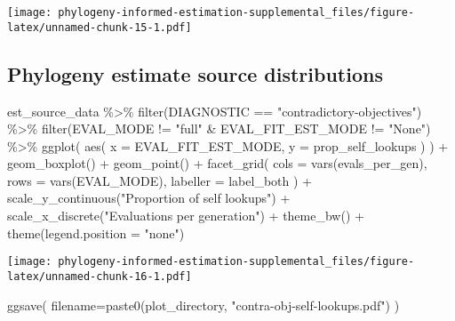 \documentclass[
]{book}
\newenvironment{Shaded}{\begin{snugshade}}{\end{snugshade}}
\newcommand{\AttributeTok}[1]{\textcolor[rgb]{0.77,0.63,0.00}{#1}}
\newcommand{\FunctionTok}[1]{\textcolor[rgb]{0.00,0.00,0.00}{#1}}
\newcommand{\NormalTok}[1]{#1}
\newcommand{\SpecialCharTok}[1]{\textcolor[rgb]{0.00,0.00,0.00}{#1}}
\newcommand{\StringTok}[1]{\textcolor[rgb]{0.31,0.60,0.02}{#1}}
\begin{document}
\texttt{[image: phylogeny-informed-estimation-supplemental\_files/figure-latex/unnamed-chunk-15-1.pdf]}

\hypertarget{phylogeny-estimate-source-distributions}{%
\subsection{Phylogeny estimate source distributions}\label{phylogeny-estimate-source-distributions}}

\begin{Shaded}
\begin{Highlighting}[]
\NormalTok{est\_source\_data }\SpecialCharTok{\%\textgreater{}\%}
  \FunctionTok{filter}\NormalTok{(DIAGNOSTIC }\SpecialCharTok{==} \StringTok{"contradictory{-}objectives"}\NormalTok{) }\SpecialCharTok{\%\textgreater{}\%}
  \FunctionTok{filter}\NormalTok{(EVAL\_MODE }\SpecialCharTok{!=} \StringTok{"full"} \SpecialCharTok{\&}\NormalTok{ EVAL\_FIT\_EST\_MODE }\SpecialCharTok{!=} \StringTok{"None"}\NormalTok{) }\SpecialCharTok{\%\textgreater{}\%}
  \FunctionTok{ggplot}\NormalTok{(}
      \FunctionTok{aes}\NormalTok{(}
        \AttributeTok{x =}\NormalTok{ EVAL\_FIT\_EST\_MODE,}
        \AttributeTok{y =}\NormalTok{ prop\_self\_lookups}
\NormalTok{      )}
\NormalTok{    ) }\SpecialCharTok{+}
    \FunctionTok{geom\_boxplot}\NormalTok{() }\SpecialCharTok{+}
    \FunctionTok{geom\_point}\NormalTok{() }\SpecialCharTok{+}
    \FunctionTok{facet\_grid}\NormalTok{(}
      \AttributeTok{cols =} \FunctionTok{vars}\NormalTok{(evals\_per\_gen),}
      \AttributeTok{rows =} \FunctionTok{vars}\NormalTok{(EVAL\_MODE),}
      \AttributeTok{labeller =}\NormalTok{ label\_both}
\NormalTok{    ) }\SpecialCharTok{+}
    \FunctionTok{scale\_y\_continuous}\NormalTok{(}\StringTok{"Proportion of self lookups"}\NormalTok{) }\SpecialCharTok{+}
    \FunctionTok{scale\_x\_discrete}\NormalTok{(}\StringTok{"Evaluations per generation"}\NormalTok{) }\SpecialCharTok{+}
    \FunctionTok{theme\_bw}\NormalTok{() }\SpecialCharTok{+}
    \FunctionTok{theme}\NormalTok{(}\AttributeTok{legend.position =} \StringTok{"none"}\NormalTok{)}
\end{Highlighting}
\end{Shaded}

\texttt{[image: phylogeny-informed-estimation-supplemental\_files/figure-latex/unnamed-chunk-16-1.pdf]}

\begin{Shaded}
\begin{Highlighting}[]
\FunctionTok{ggsave}\NormalTok{(}
   \AttributeTok{filename=}\FunctionTok{paste0}\NormalTok{(plot\_directory, }\StringTok{"contra{-}obj{-}self{-}lookups.pdf"}\NormalTok{)}
\NormalTok{)}
\end{Highlighting}
\end{Shaded}
\end{document}
